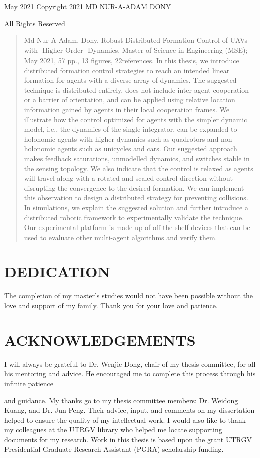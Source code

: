 \documentclass[10pt]{article}
\begin{document}
May 2021 Copyright 2021 MD NUR-A-ADAM DONY

All Rights Reserved

\begin{abstract}
Md Nur-A-Adam, Dony, Robust Distributed Formation Control of UAVs with $\underline{\text { Higher-Order }}$ Dynamics. Master of Science in Engineering (MSE); May 2021, 57 pp., 13 figures, 22references.
In this thesis, we introduce distributed formation control strategies to reach an intended linear formation for agents with a diverse array of dynamics. The suggested technique is distributed entirely, does not include inter-agent cooperation or a barrier of orientation, and can be applied using relative location information gained by agents in their local cooperation frames. We illustrate how the control optimized for agents with the simpler dynamic model, i.e., the dynamics of the single integrator, can be expanded to holonomic agents with higher dynamics such as quadrotors and non-holonomic agents such as unicycles and cars. Our suggested approach makes feedback saturations, unmodelled dynamics, and switches stable in the sensing topology. We also indicate that the control is relaxed as agents will travel along with a rotated and scaled control direction without disrupting the convergence to the desired formation. We can implement this observation to design a distributed strategy for preventing collisions. In simulations, we explain the suggested solution and further introduce a distributed robotic framework to experimentally validate the technique. Our experimental platform is made up of off-the-shelf devices that can be used to evaluate other multi-agent algorithms and verify them.
\end{abstract}

\section{DEDICATION}
The completion of my master's studies would not have been possible without the love and support of my family. Thank you for your love and patience.

\section{ACKNOWLEDGEMENTS}
I will always be grateful to Dr. Wenjie Dong, chair of my thesis committee, for all his mentoring and advice. He encouraged me to complete this process through his infinite patience

and guidance. My thanks go to my thesis committee members: Dr. Weidong Kuang, and Dr. Jun Peng. Their advice, input, and comments on my dissertation helped to ensure the quality of my intellectual work. I would also like to thank my colleagues at the UTRGV library who helped me locate supporting documents for my research. Work in this thesis is based upon the grant UTRGV Presidential Graduate Research Assistant (PGRA) scholarship funding.
\end{document}
